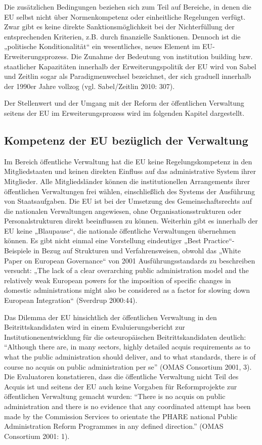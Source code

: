 Die zusätzlichen Bedingungen beziehen sich zum Teil auf Bereiche, in denen die EU selbst nicht über Normenkompetenz oder einheitliche Regelungen verfügt. Zwar gibt es keine direkte Sanktionsmöglichkeit bei der Nichterfüllung der entsprechenden Kriterien, z.B. durch finanzielle Sanktionen. Dennoch ist die „politische Konditionalität“ ein wesentliches, neues Element im EU-Erweiterungsprozess. Die Zunahme der Bedeutung von institution building bzw. staatlicher Kapazitäten innerhalb der Erweiterungspolitik der EU wird von Sabel und Zeitlin sogar als Paradigmenwechsel bezeichnet, der sich graduell innerhalb der 1990er Jahre vollzog (vgl. Sabel/Zeitlin 2010: 307).\par
Der Stellenwert und der Umgang mit der Reform der öffentlichen Verwaltung seitens der EU im Erweiterungsprozess wird im folgenden Kapitel dargestellt.

\subsection{Kompetenz der EU bezüglich der Verwaltung}
Im Bereich öffentliche Verwaltung hat die EU keine Regelungskompetenz in den Mitgliedstaaten und keinen direkten Einfluss auf das administrative System ihrer Mitglieder. Alle Mitgliedsländer können die institutionellen Arrangements ihrer öffentlichen Verwaltungen frei wählen, einschließlich des Systems der Ausführung von Staatsaufgaben. Die EU ist bei der Umsetzung des Gemeinschaftsrechts auf die nationalen Verwaltungen angewiesen, ohne Organisationsstrukturen oder Personalstrukturen direkt beeinflussen zu können. Weiterhin gibt es innerhalb der EU keine „Blaupause“, die nationale öffentliche Verwaltungen übernehmen können. Es gibt nicht einmal eine Vorstellung eindeutiger „Best Practice“-Beispiele in Bezug auf Strukturen und Verfahrensweisen, obwohl das „White Paper on European Governance“ von 2001 Ausführungsstandards zu beschreiben versucht: „The lack of a clear overarching public administration model and the relatively weak European powers for the imposition of specific changes in domestic administrations might also be considered as a factor for slowing down European Integration“ (Sverdrup 2000:44).\par

Das Dilemma der EU hinsichtlich der öffentlichen Verwaltung in den Beitrittskandidaten wird in einem Evaluierungsbericht zur Institutionenentwicklung für die osteuropäischen Beitrittskandidaten deutlich: “Although there are, in many sectors, highly detailed acquis requirements as to what the public administration should deliver, and to what standards, there is of course no acquis on public administration per se” (OMAS Consortium 2001, 3). Die Evaluatoren konstatieren, dass die öffentliche Verwaltung nicht Teil des Acquis ist und seitens der EU auch keine Vorgaben für Reformprojekte zur öffentlichen Verwaltung gemacht wurden: “There is no acquis on public administration and there is no evidence that any coordinated attempt has been made by the Commission Services to orientate the PHARE national Public Administration Reform Programmes in any defined direction.” (OMAS Consortium 2001: 1). \par

